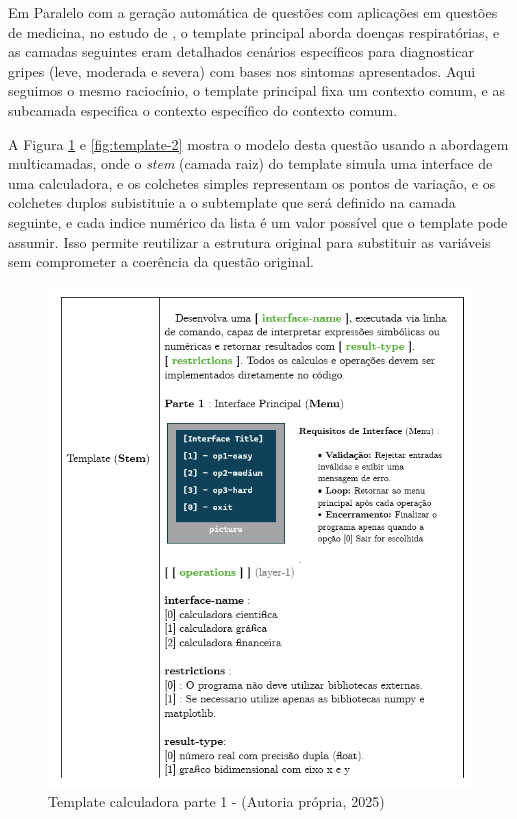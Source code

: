 Em Paralelo com a geração automática de questões com aplicações em questões de medicina, no estudo de \parencite{gierl2021}, o template principal aborda doenças respiratórias, e as camadas seguintes eram detalhados cenários específicos para diagnosticar gripes (leve, moderada e severa) com bases nos sintomas apresentados. Aqui seguimos o mesmo raciocínio, o template principal fixa um contexto comum, e as subcamada especifica o contexto específico do contexto comum.

A Figura \ref{fig:template-1} e \ref{fig:template-2} mostra o modelo desta questão usando a abordagem multicamadas, onde o \textit{stem} (camada raiz) do template simula uma interface de uma calculadora, e os colchetes simples representam os pontos de variação, e os colchetes duplos subistituie a o subtemplate que será definido na camada seguinte, e cada indice numérico da lista é um valor possível que o template pode assumir. Isso permite reutilizar a estrutura original para substituir as variáveis sem comprometer a coerência da questão original.

\begin{figure}
    \centering
    \includegraphics[width=12cm]{./imagens/capitulo4/template-1.png}
    \caption{Template calculadora parte 1 - (Autoria própria, 2025)}
    \label{fig:template-1}
\end{figure}

